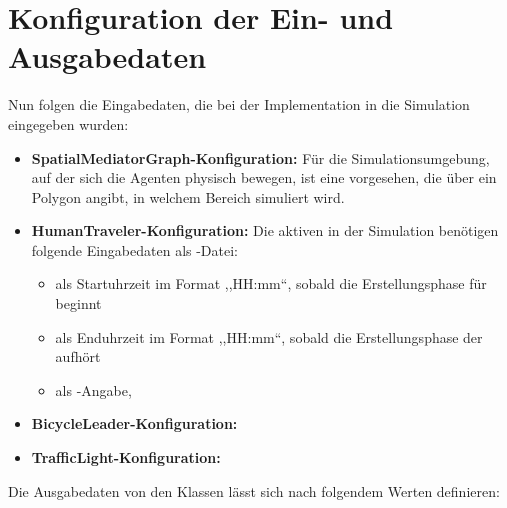 %


\section{Konfiguration der Ein- und Ausgabedaten}\label{sec:input-output-configuration}

Nun folgen die Eingabedaten, die bei der Implementation in die Simulation eingegeben wurden:


\begin{itemize}
    \item \textbf{SpatialMediatorGraph-Konfiguration:} Für die Simulationsumgebung, auf der sich die Agenten physisch bewegen, ist eine  vorgesehen, die über ein Polygon angibt, in welchem Bereich simuliert wird.
    \item \textbf{HumanTraveler-Konfiguration:} Die aktiven  in der Simulation benötigen folgende Eingabedaten als -Datei:
    \begin{itemize}
        \item {} als Startuhrzeit im Format ,,HH:mm``, sobald die Erstellungsphase für  beginnt
        \item {} als Enduhrzeit im Format ,,HH:mm``, sobald die Erstellungsphase der  aufhört
        \item {} als -Angabe,
    \end{itemize}
    \item \textbf{BicycleLeader-Konfiguration:}
    \item \textbf{TrafficLight-Konfiguration:}
\end{itemize}

Die Ausgabedaten von den Klassen lässt sich nach folgendem Werten definieren:

